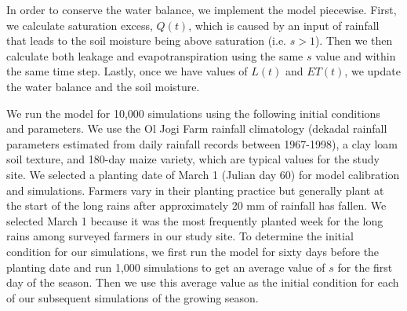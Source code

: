 

In order to conserve the water balance, we implement the model piecewise. First, we calculate saturation excess, $Q(t)$, which is caused by an input of rainfall that leads to the soil moisture being above saturation (i.e. $s>1$). Then we then calculate both leakage and evapotranspiration using the same $s$ value and within the same time step. Lastly, once we have values of $L(t)$ and $ET(t)$, we update the water balance and the soil moisture. 

We run the model for 10,000 simulations using the following initial conditions and parameters. We use the Ol Jogi Farm rainfall climatology (dekadal rainfall parameters estimated from daily rainfall records between 1967-1998), a clay loam soil texture, and 180-day maize variety, which are typical values for the study site. We selected a planting date of March 1 (Julian day 60) for model calibration and simulations. Farmers vary in their planting practice but generally plant at the start of the long rains after approximately 20 mm of rainfall has fallen. We selected March 1 because it was the most frequently planted week for the long rains among surveyed farmers in our study site. To determine the initial condition for our simulations, we first run the model for sixty days before the planting date and run 1,000 simulations to get an average value of $s$ for the first day of the season. Then we use this average value as the initial condition for each of our subsequent simulations of the growing season.

